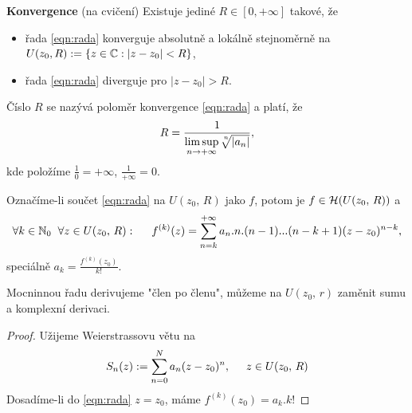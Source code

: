 \begin{properties}
 \textbf{Konvergence} (na cvičení) \newline
Existuje jediné $R\in{[0,+\infty]}$ takové, že 
\begin{itemize}
    \item řada \cref{eqn:rada} konverguje absolutně a lokálně stejnoměrně na  $U(z_0,R):=\{z\in\operatorname{\mathbb{C}}   : |z-z_0|<R\}$, 
    \item řada \cref{eqn:rada} diverguje pro $|z-z_0|>R$. 
\end{itemize}
Číslo $R$ se nazývá poloměr konvergence \cref{eqn:rada} a platí, že
\[R=\frac{1}{
\underset{n\to+\infty}{\limsup}{\sqrt[\leftroot{-3}\uproot{3}n]{|a_n|}}},\]
kde položíme $\frac{1}{0}=+\infty$, $\frac{1}{+\infty}=0$.

 Označíme-li součet \cref{eqn:rada} na $U(z_0,\, R)$ jako $f$, potom je $f\in\operatorname{\mathcal{H}} (U(z_0,\, R))$ a 
\[
\forall{k\in\operatorname{\mathbb{N}}_0}\hspace{2mm}\forall{z\in{U(z_0,\,R)}}: \hspace{5mm}
f^{(k)}(z)=
\sum_{n=k}^{+\infty}{a_n.n.(n-1)...(n-k+1)(z-z_0)^{n-k}},\]
speciálně $a_k=\frac{f^{(k)}(z_0)}{k!}$.
\end{properties}

\begin{note}
Mocninnou řadu derivujeme "člen po členu", můžeme na $U(z_0,\,r)$ zaměnit sumu a komplexní derivaci.
\end{note}

\begin{proof}
Užijeme Weierstrassovu větu na 
\[S_n(z):=\sum_{n=0}^N{a_n(z-z_0)^n},\hspace{5mm} z\in{U(z_0,\,R)}\]
Dosadíme-li do \cref{eqn:rada} $z=z_0$, máme $f^{(k)}(z_0)={a_k}.{k!}$
\end{proof}
